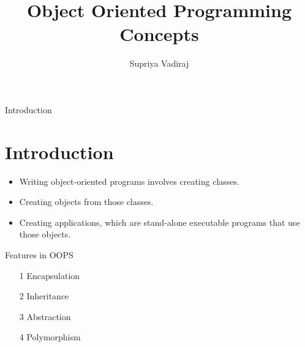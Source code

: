 \documentclass[10pt]{beamer}
\author{Supriya Vadiraj}
\title{Object Oriented Programming Concepts}
\institute{University of Applied Sciences Bonn-Rhein-Sieg}
\begin{document}
	\begin{frame}
		\titlepage
	\end{frame}
	\begin{frame}{Introduction}
		\section{Introduction}
		\begin{itemize}
			\item Writing object-oriented programs involves creating classes.
			\item Creating objects from those classes.
			\item Creating applications, which are stand-alone executable programs that use those objects. 
		\end{itemize}
	\end{frame}
		
	\begin{frame}{Features in OOPS}
		\begin{itemize}
			\item[1] Encapsulation
			
			\item[2] Inheritance
			
			\item[3] Abstraction
			
			\item[4] Polymorphism
\end{itemize}		
	\end{frame}
	
\end{document}
